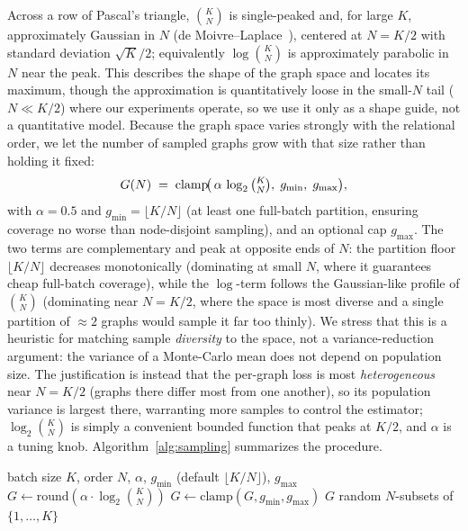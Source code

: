\documentclass[11pt,letterpaper]{article}
\begin{document}
Across a row of Pascal's triangle, $\binom{K}{N}$ is single-peaked and, for large
$K$, approximately Gaussian in $N$ (de Moivre--Laplace~\cite{feller1968probability}), centered at $N = K/2$ with
standard deviation $\sqrt{K}/2$; equivalently $\log\binom{K}{N}$ is approximately
parabolic in $N$ near the peak. This describes the shape of the graph space and
locates its maximum, though the approximation is quantitatively loose in the
small-$N$ tail ($N \ll K/2$) where our experiments operate, so we use it only as a
shape guide, not a quantitative model. Because the graph space varies strongly with
the relational order, we let the number of sampled graphs grow with that size rather
than holding it fixed:
\begin{equation}
    G(N) \;=\; \mathrm{clamp}\!\big(\,\alpha \, \log_2 \tbinom{K}{N},\; g_{\min},\; g_{\max}\big),
    \label{eq:adaptive_sampling}
\end{equation}
with $\alpha = 0.5$ and $g_{\min} = \lfloor K/N \rfloor$ (at least one full-batch
partition, ensuring coverage no worse than node-disjoint sampling), and an optional
cap $g_{\max}$. The two terms are complementary and peak at opposite ends of $N$: the
partition floor $\lfloor K/N \rfloor$ decreases monotonically (dominating at small
$N$, where it guarantees cheap full-batch coverage), while the $\log$-term follows the
Gaussian-like profile of $\binom{K}{N}$ (dominating near $N = K/2$, where the space is
most diverse and a single partition of $\approx 2$ graphs would sample it far too
thinly). We stress that this is a heuristic for matching sample \emph{diversity} to
the space, not a variance-reduction argument: the variance of a Monte-Carlo mean does
not depend on population size. The justification is instead that the per-graph loss is
most \emph{heterogeneous} near $N = K/2$ (graphs there differ most from one another),
so its population variance is largest there, warranting more samples to control the
estimator; $\log_2\binom{K}{N}$ is simply a convenient bounded function that peaks at
$K/2$, and $\alpha$ is a tuning knob. Algorithm~\ref{alg:sampling} summarizes the
procedure.

\begin{algorithm}[htbp]
\caption{Adaptive graph sampling}
\label{alg:sampling}
\begin{algorithmic}[1]
\Require batch size $K$, order $N$, $\alpha$, $g_{\min}$ (default $\lfloor K/N \rfloor$), $g_{\max}$
\State $G \gets \mathrm{round}(\alpha \cdot \log_2 \binom{K}{N})$
\State $G \gets \mathrm{clamp}(G, g_{\min}, g_{\max})$
\State \Return $G$ random $N$-subsets of $\{1, \ldots, K\}$ 
\end{algorithmic}
\end{algorithm}
\end{document}
